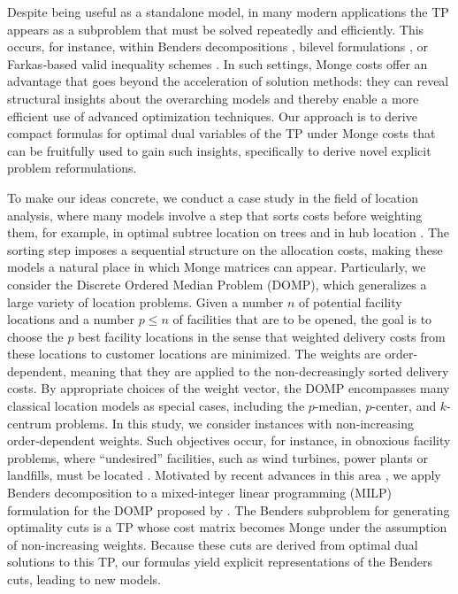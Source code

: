 \documentclass[letterpaper]{article}
\begin{document}
Despite being useful as a standalone model, in many modern applications the TP appears as a subproblem that must be solved repeatedly and efficiently. This occurs, for instance, within Benders decompositions \citep[e.g.,][]{fischetti_benders_2016}, bilevel formulations \citep[e.g.,][]{hillbrecht2025bilevel, singh_bilevel_TP}, or Farkas‑based valid inequality schemes \citep[e.g.,][]{espejo_single_alloc_hub}. In such settings, Monge costs offer an advantage that goes beyond the acceleration of solution methods: they can reveal structural insights about the overarching models and thereby enable a more efficient use of advanced optimization techniques. Our approach is to derive compact formulas for optimal dual variables of the TP under Monge costs that can be fruitfully used to gain such insights, specifically to derive novel explicit problem reformulations.

To make our ideas concrete, we conduct a case study in the field of location analysis, where many models involve a step that sorts costs before weighting them, for example, in optimal subtree location on trees \citep[e.g.,][]{PuertoTamir2005, Pozo2024} and in hub location \citep[e.g.,][]{PUERTO2011, Pozo2021}. 
The sorting step imposes a sequential structure on the allocation costs, making these models a natural place in which Monge matrices can appear. Particularly, we consider the Discrete Ordered Median Problem (DOMP), which generalizes a large variety of location problems. Given a number $n$ of potential facility locations and a number $p \leq n$ of facilities that are to be opened, the goal is to choose the $p$ best facility locations in the sense that weighted delivery costs from these locations to customer locations are minimized. The weights are order-dependent, meaning that they are applied to the non-decreasingly sorted delivery costs. By appropriate choices of the weight vector, the DOMP encompasses many classical location models as special cases, including the $p$-median, $p$-center, and $k$-centrum problems. In this study, we consider instances with non‑increasing order‑dependent weights. Such objectives occur, for instance, in obnoxious facility problems, where \enquote{undesired} facilities, such as wind turbines, power plants or landfills, must be located \citep{church_review_2022}. Motivated by recent advances in this area \citep[e.g.,][]{bigler_matheuristic_2024, kalczynski_obnoxious_2026}, we apply Benders decomposition to a mixed-integer linear programming (MILP) formulation for the DOMP proposed by \citet{labbe_comparative_2017}. The Benders subproblem for generating optimality cuts is a TP whose cost matrix becomes Monge under the assumption of non-increasing weights. Because these cuts are derived from optimal dual solutions to this TP, our formulas yield explicit representations of the Benders cuts, leading to new models.
\end{document}

